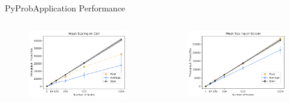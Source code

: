 \documentclass[AERbeamer%
              ,optEnglish%
              ,optBiber%
              ,optBibstyleAlphabetic%
              ,optBeamerClassicFormat%
              ]{AERlatex}%
\begin{document}
\begin{frame}[c]{PyProb}{Application Performance}
    \centering
    \begin{columns}[T]
        \begin{column}{0.48\textwidth}
            \centering
            \begin{figure}
                \centering
                \includegraphics[width=\textwidth]{PyProbScalingCori.png}
            \end{figure}
        \end{column}
        \begin{column}{0.48\textwidth}
            \centering
            \begin{figure}
                \centering
                \includegraphics[width=\textwidth]{PyProbScalingEdison.png}
            \end{figure}
        \end{column}
    \end{columns}
\end{frame}
\end{document}
